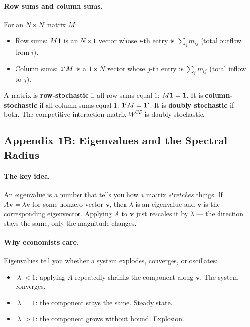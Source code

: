\documentclass[../structural_economics_book.tex]{subfiles}
\begin{document}
\paragraph{Row sums and column sums.} For an $N \times N$ matrix $M$:
\begin{itemize}
\item Row sums: $M\mathbf{1}$ is an $N \times 1$ vector whose $i$-th entry is $\sum_j m_{ij}$ (total outflow from $i$).
\item Column sums: $\mathbf{1}'M$ is a $1 \times N$ vector whose $j$-th entry is $\sum_i m_{ij}$ (total inflow to $j$).
\end{itemize}

A matrix is \textbf{row-stochastic} if all row sums equal 1: $M\mathbf{1} = \mathbf{1}$. It is \textbf{column-stochastic} if all column sums equal 1: $\mathbf{1}'M = \mathbf{1}'$. It is \textbf{doubly stochastic} if both. The competitive interaction matrix $W^{CE}$ is doubly stochastic.


\subsection*{Appendix 1B: Eigenvalues and the Spectral Radius}
\label{ch01:app:spectral_radius}

\paragraph{The key idea.} An eigenvalue is a number that tells you how a matrix \textit{stretches} things. If $A\mathbf{v} = \lambda\mathbf{v}$ for some nonzero vector $\mathbf{v}$, then $\lambda$ is an eigenvalue and $\mathbf{v}$ is the corresponding eigenvector. Applying $A$ to $\mathbf{v}$ just rescales it by $\lambda$ --- the direction stays the same, only the magnitude changes.

\paragraph{Why economists care.} Eigenvalues tell you whether a system explodes, converges, or oscillates:
\begin{itemize}
\item $|\lambda| < 1$: applying $A$ repeatedly shrinks the component along $\mathbf{v}$. The system converges.
\item $|\lambda| = 1$: the component stays the same. Steady state.
\item $|\lambda| > 1$: the component grows without bound. Explosion.
\end{itemize}
\end{document}
